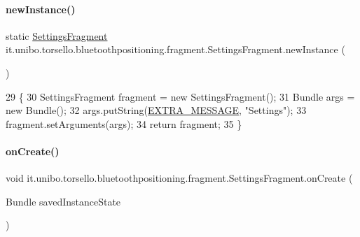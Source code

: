 \paragraph{\texorpdfstring{new\+Instance()}{newInstance()}}
{\footnotesize\ttfamily static \hyperlink{classit_1_1unibo_1_1torsello_1_1bluetoothpositioning_1_1fragment_1_1SettingsFragment}{Settings\+Fragment} it.\+unibo.\+torsello.\+bluetoothpositioning.\+fragment.\+Settings\+Fragment.\+new\+Instance (\begin{DoxyParamCaption}{ }\end{DoxyParamCaption})\hspace{0.3cm}{\ttfamily [static]}}


\begin{DoxyCode}
29                                                  \{
30         SettingsFragment fragment = \textcolor{keyword}{new} SettingsFragment();
31         Bundle args = \textcolor{keyword}{new} Bundle();
32         args.putString(\hyperlink{classit_1_1unibo_1_1torsello_1_1bluetoothpositioning_1_1fragment_1_1SettingsFragment_a3f3c627008cd1e176afc52642c73fd93_a3f3c627008cd1e176afc52642c73fd93}{EXTRA\_MESSAGE}, \textcolor{stringliteral}{"Settings"});
33         fragment.setArguments(args);
34         \textcolor{keywordflow}{return} fragment;
35     \}
\end{DoxyCode}
\hypertarget{classit_1_1unibo_1_1torsello_1_1bluetoothpositioning_1_1fragment_1_1SettingsFragment_a7de90efb25e655078f5f8984f7c6d628_a7de90efb25e655078f5f8984f7c6d628}{}\label{classit_1_1unibo_1_1torsello_1_1bluetoothpositioning_1_1fragment_1_1SettingsFragment_a7de90efb25e655078f5f8984f7c6d628_a7de90efb25e655078f5f8984f7c6d628} 
\paragraph{\texorpdfstring{on\+Create()}{onCreate()}}
{\footnotesize\ttfamily void it.\+unibo.\+torsello.\+bluetoothpositioning.\+fragment.\+Settings\+Fragment.\+on\+Create (\begin{DoxyParamCaption}\item[{Bundle}]{saved\+Instance\+State }\end{DoxyParamCaption})}


